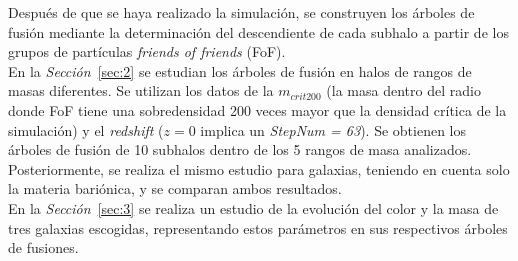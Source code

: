 Después de que se haya realizado la simulación, se construyen los árboles de fusión mediante la determinación del descendiente de cada subhalo a partir de los grupos de partículas \textit{friends of friends} (FoF). \\ 

En la \textit{Sección}~\ref{sec:2} se estudian los árboles de fusión en halos de rangos de masas diferentes. Se utilizan los datos de la $m_{crit200}$ (la masa dentro del radio donde FoF tiene una sobredensidad 200 veces mayor que la densidad crítica de la simulación) y el \textit{redshift} ($z=0$ implica un \textit{StepNum = 63}). Se obtienen los árboles de fusión de 10 subhalos dentro de los 5 rangos de masa analizados. Posteriormente, se realiza el mismo estudio para galaxias, teniendo en cuenta solo la materia bariónica, y se comparan ambos resultados.\\ 

En la \textit{Sección}~\ref{sec:3} se realiza un estudio de la evolución del color y la masa de tres galaxias escogidas, representando estos parámetros en sus respectivos árboles de fusiones. 

 























